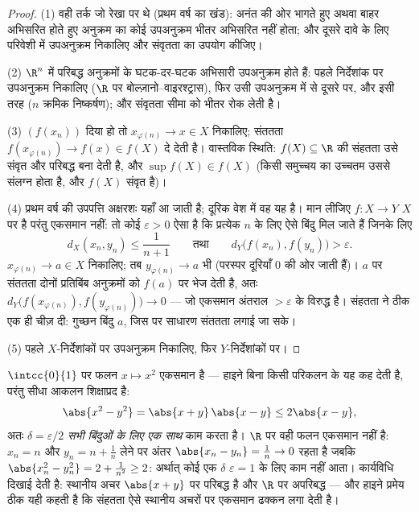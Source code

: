 \begin{proof}
(1) वही तर्क जो रेखा पर थे (प्रथम वर्ष का खंड): अनंत की ओर भागते हुए%
अथवा बाहर अभिसरित होते हुए अनुक्रम का कोई उपअनुक्रम भीतर अभिसरित नहीं
होता; और दूसरे दावे के लिए परिवेशी  में उपअनुक्रम निकालिए और
संवृतता का उपयोग कीजिए।

(2) $\R^n$ में परिबद्ध अनुक्रमों के घटक-दर-घटक अभिसारी उपअनुक्रम होते हैं:
पहले निर्देशांक पर उपअनुक्रम निकालिए ($\R$ पर
बोल्ज़ानो--वाइरश्ट्रास), फिर उसी उपअनुक्रम में से दूसरे पर, और इसी तरह
($n$ क्रमिक निष्कर्षण); और संवृतता सीमा को भीतर रोक लेती है।

(3) $(f(x_n))$ दिया हो तो $x_{\varphi(n)} \to x \in X$ निकालिए; संततता $f(x_{\varphi(n)}) \to f(x) \in f(X)$ दे देती है। वास्तविक
स्थिति: $f(X) \subseteq \R$ की संहतता उसे संवृत और परिबद्ध बना देती है, और $\sup f(X) \in f(X)$ (किसी
समुच्चय का उच्चतम उससे संलग्न होता है, और $f(X)$ संवृत है)।

(4) प्रथम वर्ष की उपपत्ति अक्षरशः यहाँ आ जाती है; दूरिक वेश में वह यह
है। मान लीजिए $f \colon X \to Y$  $X$ पर  है परंतु एकसमान  नहीं: तो कोई
$\varepsilon > 0$ ऐसा है कि प्रत्येक $n$ के लिए ऐसे बिंदु मिल जाते हैं जिनके लिए
\[
d_X(x_n, y_n) \leq \frac{1}{n+1}
\qquad\text{तथा}\qquad
d_Y\bigl(f(x_n), f(y_n)\bigr) > \varepsilon .
\]
$x_{\varphi(n)} \to a \in X$ निकालिए; तब $y_{\varphi(n)} \to
a$ भी (परस्पर दूरियाँ $0$ की ओर जाती हैं)। $a$ पर
संततता दोनों प्रतिबिंब अनुक्रमों को $f(a)$ पर भेज देती है, अतः $d_Y\bigl(f(x_{\varphi(n)}), f(y_{\varphi(n)})\bigr) \to 0$ ---
जो एकसमान अंतराल $> \varepsilon$ के विरुद्ध है। संहतता ने ठीक एक ही चीज़ दी:
गुच्छन बिंदु $a$, जिस पर साधारण संततता लगाई जा सके।

(5) पहले $X$-निर्देशांकों पर उपअनुक्रम निकालिए, फिर $Y$-निर्देशांकों
पर।
\end{proof}

\begin{example}\label{ex:b2:metric:heinework}
$\intcc{0}{1}$ पर फलन $x \mapsto x^2$ एकसमान  है --- हाइने बिना किसी परिकलन के यह कह देती
है, परंतु सीधा आकलन शिक्षाप्रद है:
\[
\abs{x^2 - y^2} = \abs{x + y}\,\abs{x - y} \leq 2\abs{x - y},
\]
अतः $\delta = \varepsilon/2$ \emph{सभी बिंदुओं के लिए एक साथ} काम करता है। $\R$ पर वही फलन
एकसमान  नहीं है: $x_n = n$ और $y_n = n + \frac1n$ लेने पर अंतर $\abs{x_n - y_n}
= \frac1n \to 0$ रहता है जबकि $\abs{x_n^2 - y_n^2} = 2 + \frac1{n^2}
\geq 2$:
अर्थात् कोई एक $\delta$ $\varepsilon = 1$ के लिए काम नहीं आता। कार्यविधि दिखाई देती है:
स्थानीय  अचर $\abs{x + y}$  पर परिबद्ध है और $\R$ पर अपरिबद्ध ---
और हाइने प्रमेय ठीक यही कहती है कि संहतता ऐसे स्थानीय अचरों पर एकसमान
ढक्कन लगा देती है।
\end{example}

